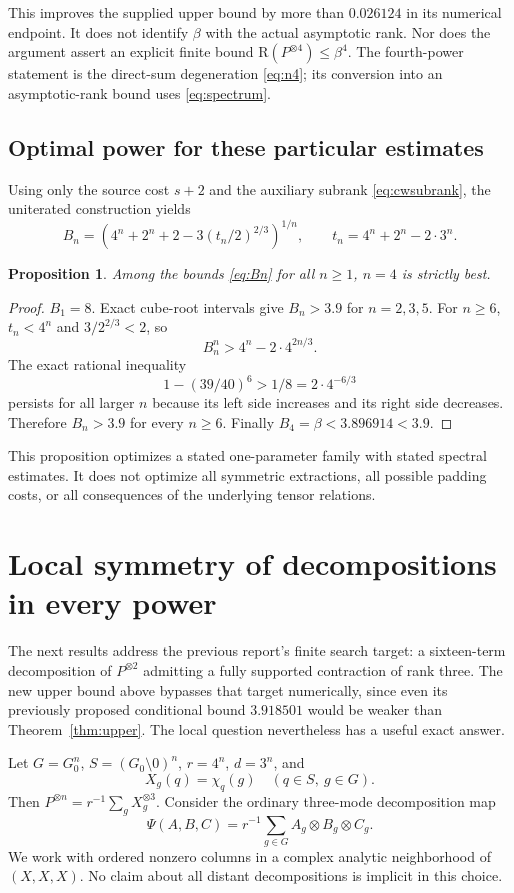 \documentclass[11pt]{article}
\newtheorem{proposition}[theorem]{Proposition}
\theoremstyle{definition}\newtheorem{definition}[theorem]{Definition}
\newcommand{\R}{\mathrm R}
\begin{document}
This improves the supplied upper bound by more than $0.026124$ in its numerical endpoint. It does not identify $\beta$ with the actual asymptotic rank. Nor does the argument assert an explicit finite bound $\R(P^{\otimes4})\le\beta^4$. The fourth-power statement is the direct-sum degeneration \eqref{eq:n4}; its conversion into an asymptotic-rank bound uses \eqref{eq:spectrum}.

\subsection{Optimal power for these particular estimates}
Using only the source cost $s+2$ and the auxiliary subrank \eqref{eq:cwsubrank}, the uniterated construction yields
\begin{equation}\label{eq:Bn}
B_n=\left(4^n+2^n+2-3(t_n/2)^{2/3}\right)^{1/n},
\qquad t_n=4^n+2^n-2\cdot3^n.
\end{equation}
\begin{proposition}\label{prop:seedopt}
Among the bounds \eqref{eq:Bn} for all $n\ge1$, $n=4$ is strictly best.
\end{proposition}
\begin{proof}
$B_1=8$. Exact cube-root intervals give $B_n>3.9$ for $n=2,3,5$. For $n\ge6$, $t_n<4^n$ and $3/2^{2/3}<2$, so
\[
B_n^n>4^n-2\cdot4^{2n/3}.
\]
The exact rational inequality
\[
1-(39/40)^6>1/8=2\cdot4^{-6/3}
\]
persists for all larger $n$ because its left side increases and its right side decreases. Therefore $B_n>3.9$ for every $n\ge6$. Finally $B_4=\beta<3.896914<3.9$.
\end{proof}
This proposition optimizes a stated one-parameter family with stated spectral estimates. It does not optimize all symmetric extractions, all possible padding costs, or all consequences of the underlying tensor relations.

\section{Local symmetry of decompositions in every power}\label{sec:localsym}
The next results address the previous report's finite search target: a sixteen-term decomposition of $P^{\otimes2}$ admitting a fully supported contraction of rank three. The new upper bound above bypasses that target numerically, since even its previously proposed conditional bound $3.918501$ would be weaker than Theorem~\ref{thm:upper}. The local question nevertheless has a useful exact answer.

Let $G=G_0^n$, $S=(G_0\setminus0)^n$, $r=4^n$, $d=3^n$, and
\[
X_g(q)=\chi_q(g)\quad(q\in S,\ g\in G).
\]
Then $P^{\otimes n}=r^{-1}\sum_gX_g^{\otimes3}$. Consider the ordinary three-mode decomposition map
\[
\Psi(A,B,C)=r^{-1}\sum_{g\in G}A_g\otimes B_g\otimes C_g.
\]
We work with ordered nonzero columns in a complex analytic neighborhood of $(X,X,X)$. No claim about all distant decompositions is implicit in this choice.
\end{document}

